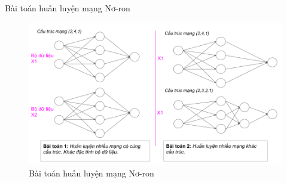 	\begin{frame}{Bài toán huấn luyện mạng Nơ-ron}
	    \begin{figure}[ht]
            \centering
            \includegraphics[width=1.0\linewidth]{images/neural-problem.png}
            \caption{Bài toán huấn luyện mạng Nơ-ron}
            \label{fig:problem:neural-problem}
        \end{figure}
	\end{frame}